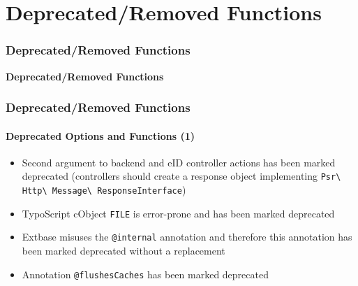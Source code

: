 %

\section{Deprecated/Removed Functions}
\begin{frame}[fragile]
	\frametitle{Deprecated/Removed Functions}

	\begin{center}\huge{\color{typo3darkgrey}\textbf{Deprecated/Removed Functions}}\end{center}

\end{frame}


\begin{frame}[fragile]
	\frametitle{Deprecated/Removed Functions}
	\framesubtitle{Deprecated Options and Functions (1)}

	\begin{itemize}
		\item Second argument to backend and eID controller actions has been
			marked deprecated (controllers should create a response object
			implementing
			\texttt{Psr\textbackslash
				Http\textbackslash
				Message\textbackslash
				ResponseInterface})
		\item TypoScript cObject \texttt{FILE} is error-prone and has been
			marked deprecated
		\item Extbase misuses the \texttt{@internal} annotation and therefore
			this annotation has been marked  deprecated without a replacement
		\item Annotation \texttt{@flushesCaches} has been marked deprecated
	\end{itemize}

\end{frame}



